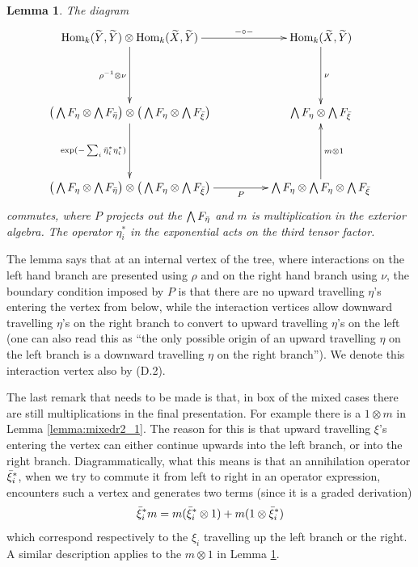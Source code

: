 \documentclass[english,letter paper,12pt,leqno]{article}
\newtheorem{lemma}[theorem]{Lemma}
\theoremstyle{example}
\numberwithin{equation}{section}
\def\Hom{\operatorname{Hom}}
\def\be{\begin{equation}}
\def\ee{\end{equation}}
\begin{document}
\begin{lemma}\label{lemma:mixedr2_2} The diagram
\be
\xymatrix@C+2pc@R+2pc{
\Hom_k( \widetilde{Y}, \widetilde{Y} ) \otimes \Hom_k( \widetilde{X}, \widetilde{Y} ) \ar[d]_-{\rho^{-1} \otimes \nu} \ar[r]^-{- \circ -} & \Hom_k( \widetilde{X}, \widetilde{Y} ) \ar[d]^-\nu\\
\big( \bigwedge F_\eta \otimes \bigwedge F_{\Bar{\eta}} \big) \otimes \big( \bigwedge F_\eta \otimes \bigwedge F_{\Bar{\xi}} \big) \ar[d]_-{\exp( -\sum_i \Bar{\eta}_i^* \eta_i^* )} & \bigwedge F_\eta \otimes \bigwedge F_{\Bar{\xi}} \\
\big( \bigwedge F_\eta \otimes \bigwedge F_{\Bar{\eta}} \big) \otimes \big( \bigwedge F_\eta \otimes \bigwedge F_{\Bar{\xi}} \big) \ar[r]_-P & \bigwedge F_\eta \otimes \bigwedge F_\eta \otimes \bigwedge F_{\Bar{\xi}} \ar[u]_-{m \otimes 1}
}
\ee
commutes, where $P$ projects out the $\bigwedge F_{\Bar{\eta}}$ and $m$ is multiplication in the exterior algebra. The operator $\eta_i^*$ in the exponential acts on the third tensor factor.
\end{lemma}

The lemma says that at an internal vertex of the tree, where interactions on the left hand branch are presented using $\rho$ and on the right hand branch using $\nu$, the boundary condition imposed by $P$ is that there are no upward travelling $\eta$'s entering the vertex from below, while the interaction vertices allow downward travelling $\eta$'s on the right branch to convert to upward travelling $\eta$'s on the left (one can also read this as ``the only possible origin of an upward travelling $\eta$ on the left branch is a downward travelling $\eta$ on the right branch''). We denote this interaction vertex also by (D.2).

The last remark that needs to be made is that, in box of the mixed cases there are still multiplications in the final presentation. For example there is a $1 \otimes m$ in Lemma \ref{lemma:mixedr2_1}. The reason for this is that upward travelling $\xi$'s entering the vertex can either continue upwards into the left branch, or into the right branch. Diagrammatically, what this means is that an annihilation operator $\Bar{\xi}_i^*$, when we try to commute it from left to right in an operator expression, encounters such a vertex and generates two terms (since it is a graded derivation)
\be\label{eq:xi_is_derivation}
\Bar{\xi}_i^* m = m (\Bar{\xi}_i^* \otimes 1) + m( 1 \otimes \Bar{\xi}_i^* )
\ee
which correspond respectively to the $\xi_i$ travelling up the left branch or the right. A similar description applies to the $m \otimes 1$ in Lemma \ref{lemma:mixedr2_2}. 
\end{document}
